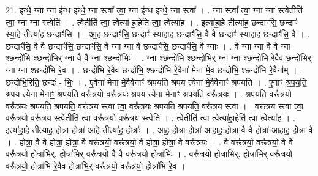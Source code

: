 \documentclass[17pt]{extarticle}
\begin{document}
21. इ॒न्धे॒ ग्ना ग्ना इ॑न्ध इन्धे॒ ग्ना स्त्वा᳚ त्वा॒ ग्ना इ॑न्ध इन्धे॒ ग्ना स्त्वा᳚ । . ग्ना स्त्वा᳚ त्वा॒ ग्ना ग्ना स्त्वेतीति॑ त्वा॒ ग्ना ग्ना स्त्वेति॑ । . त्वेतीति॑ त्वा॒ त्वेत्या॑ हा॒हेति॑ त्वा॒ त्वेत्या॑ह । . इत्या॑हा॒हे तीत्या॑ह॒ छन्दाꣳ॑सि॒ छन्दाꣳ॑ स्या॒हे तीत्या॑ह॒ छन्दाꣳ॑सि । . आ॒ह॒ छन्दाꣳ॑सि॒ छन्दाꣳ॑ स्याहाह॒ छन्दाꣳ॑सि॒ वै वै छन्दाꣳ॑ स्याहाह॒ छन्दाꣳ॑सि॒ वै । . छन्दाꣳ॑सि॒ वै वै छन्दाꣳ॑सि॒ छन्दाꣳ॑सि॒ वै ग्ना ग्ना वै छन्दाꣳ॑सि॒ छन्दाꣳ॑सि॒ वै ग्नाः । . वै ग्ना ग्ना वै वै ग्ना श्छन्दो॑भि॒ श्छन्दो॑भि॒र् ग्ना वै वै ग्ना श्छन्दो॑भिः । . ग्ना श्छन्दो॑भि॒ श्छन्दो॑भि॒र् ग्ना ग्ना श्छन्दो॑भि रे॒वैव छन्दो॑भि॒र् ग्ना ग्ना श्छन्दो॑भि रे॒व । . छन्दो॑भि रे॒वैव छन्दो॑भि॒ श्छन्दो॑भि रे॒वैना॑ मेना मे॒व छन्दो॑भि॒ श्छन्दो॑भि रे॒वैना᳚म् । . छन्दो॑भि॒रिति॒ छन्दः॑ - भिः॒ । . ए॒वैना॑ मेना मे॒वैवैनाꣳ॑ श्रपयति श्रपय त्येना मे॒वैवैनाꣳ॑ श्रपयति । . ए॒नाꣳ॒॒ श्र॒प॒य॒ति॒ श्र॒प॒य॒ त्ये॒ना॒ मे॒नाꣳ॒॒ श्र॒प॒य॒ति॒ वरू᳚त्रयो॒ वरू᳚त्रयः श्रपय त्येना मेनाꣳ श्रपयति॒ वरू᳚त्रयः । . श्र॒प॒य॒ति॒ वरू᳚त्रयो॒ वरू᳚त्रयः श्रपयति श्रपयति॒ वरू᳚त्रय स्त्वा त्वा॒ वरू᳚त्रयः श्रपयति श्रपयति॒ वरू᳚त्रय स्त्वा । . वरू᳚त्रय स्त्वा त्वा॒ वरू᳚त्रयो॒ वरू᳚त्रय॒ स्त्वेतीति॑ त्वा॒ वरू᳚त्रयो॒ वरू᳚त्रय॒ स्त्वेति॑ । . त्वेतीति॑ त्वा॒ त्वेत्या॑हा॒हेति॑ त्वा॒ त्वेत्या॑ह । . इत्या॑हा॒हे तीत्या॑ह॒ होत्रा॒ होत्रा॑ आ॒हे तीत्या॑ह॒ होत्राः᳚ । . आ॒ह॒ होत्रा॒ होत्रा॑ आहाह॒ होत्रा॒ वै वै होत्रा॑ आहाह॒ होत्रा॒ वै । . होत्रा॒ वै वै होत्रा॒ होत्रा॒ वै वरू᳚त्रयो॒ वरू᳚त्रयो॒ वै होत्रा॒ होत्रा॒ वै वरू᳚त्रयः । . वै वरू᳚त्रयो॒ वरू᳚त्रयो॒ वै वै वरू᳚त्रयो॒ होत्रा॑भि॒र्॒. होत्रा॑भि॒र् वरू᳚त्रयो॒ वै वै वरू᳚त्रयो॒ होत्रा॑भिः । . वरू᳚त्रयो॒ होत्रा॑भि॒र्॒. होत्रा॑भि॒र् वरू᳚त्रयो॒ वरू᳚त्रयो॒ होत्रा॑भि रे॒वैव होत्रा॑भि॒र् वरू᳚त्रयो॒ वरू᳚त्रयो॒ होत्रा॑भि रे॒व । \newline
\end{document}
